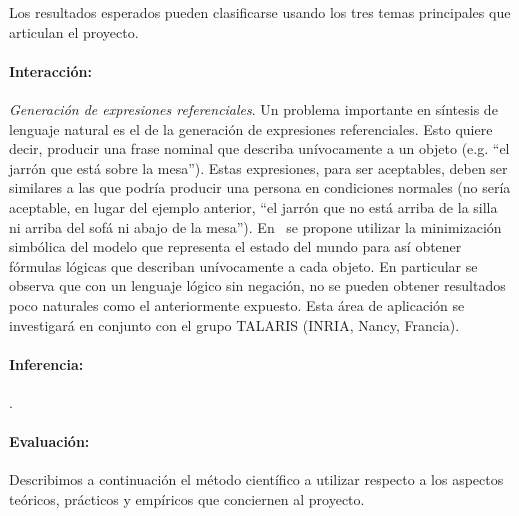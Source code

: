 
\vspace*{.2cm}%



Los resultados esperados pueden clasificarse usando los
tres temas principales que articulan el proyecto.


\paragraph{Interacci\'on:}

\emph{Generaci\'on de expresiones referenciales}. Un problema importante en
s\'intesis de lenguaje natural es el de la generaci\'on de expresiones
referenciales. Esto quiere decir, producir una frase nominal que describa
un\'ivocamente a un objeto (e.g. ``el jarr\'on que est\'a sobre la mesa'').
Estas expresiones, para ser aceptables, deben ser similares a las que podr\'ia
producir una persona en condiciones normales (no ser\'ia aceptable, en lugar del
ejemplo anterior, ``el jarr\'on que no est\'a arriba de la silla ni arriba del
sof\'a ni abajo de la mesa'').  En~\cite{AKS08} se propone utilizar la
minimizaci\'on simb\'olica del modelo que representa
el estado del mundo para as\'i obtener f\'ormulas l\'ogicas que describan
un\'ivocamente a cada objeto. En particular se observa que con un
lenguaje l\'ogico sin negaci\'on, no se pueden obtener resultados poco
naturales como el anteriormente expuesto. Esta \'area de aplicaci\'on se
investigar\'a en conjunto con el grupo TALARIS (INRIA,
Nancy, Francia).

\paragraph{Inferencia:}
\citep{arec:logi00}.


\paragraph{Evaluaci\'on:}



Describimos a continuaci\'on el m\'etodo cient\'ifico a utilizar
respecto a los aspectos te\'oricos, pr\'acticos y emp\'iricos
que conciernen al proyecto.

